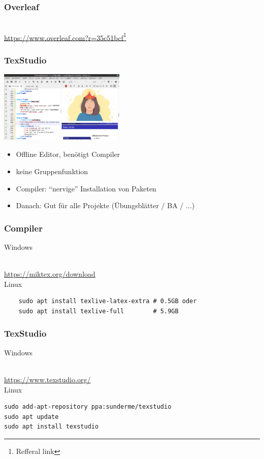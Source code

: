 \documentclass{beamer}
\begin{document}
\begin{frame}
	\frametitle{Overleaf}
	\centering
	\\
	\url{https://www.overleaf.com?r=35c51bcf}\footnote{Refferal link}
\end{frame}

\begin{frame}
	\frametitle{TexStudio}
	\includegraphics[width=6cm]{pictures/texstudio.png}
	\begin{itemize}[<+->]
		\item Offline Editor, benötigt Compiler
		\item keine Gruppenfunktion
		\item Compiler: ``nervige'' Installation von Paketen
		\item Danach: Gut für alle Projekte (Übungsblätter / BA / ...)
	\end{itemize}
\end{frame}

\begin{frame}[fragile]
	\frametitle{Compiler}
	Windows\vspace{2mm}
	\centering
	
	\\
	\url{https://miktex.org/download}\\
	\vspace{5mm}
	\hline
	\vspace{5mm}
	Linux
	\begin{verbatim}
	sudo apt install texlive-latex-extra # 0.5GB oder
	sudo apt install texlive-full        # 5.9GB
	\end{verbatim}
\end{frame}

\begin{frame}[fragile]
	\frametitle{TexStudio}
	Windows\vspace{2mm}
	\centering
	
	\\
	\url{https://www.texstudio.org/}\\
	\vspace{5mm}
	\hline
	\vspace{5mm}
	Linux
	\begin{verbatim}
sudo add-apt-repository ppa:sunderme/texstudio
sudo apt update
sudo apt install texstudio
\end{verbatim}
\end{frame}
\end{document}
